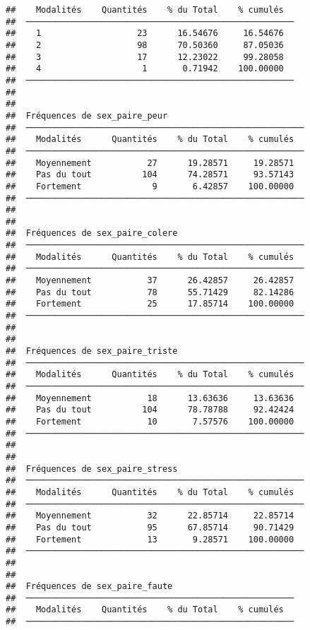 \documentclass[
]{article}
\begin{document}
\begin{verbatim}
##    Modalités    Quantités    % du Total    % cumulés   
##  ───────────────────────────────────────────────────── 
##    1                   23      16.54676     16.54676   
##    2                   98      70.50360     87.05036   
##    3                   17      12.23022     99.28058   
##    4                    1       0.71942    100.00000   
##  ───────────────────────────────────────────────────── 
## 
## 
##  Fréquences de sex_paire_peur                            
##  ─────────────────────────────────────────────────────── 
##    Modalités      Quantités    % du Total    % cumulés   
##  ─────────────────────────────────────────────────────── 
##    Moyennement           27      19.28571     19.28571   
##    Pas du tout          104      74.28571     93.57143   
##    Fortement              9       6.42857    100.00000   
##  ─────────────────────────────────────────────────────── 
## 
## 
##  Fréquences de sex_paire_colere                          
##  ─────────────────────────────────────────────────────── 
##    Modalités      Quantités    % du Total    % cumulés   
##  ─────────────────────────────────────────────────────── 
##    Moyennement           37      26.42857     26.42857   
##    Pas du tout           78      55.71429     82.14286   
##    Fortement             25      17.85714    100.00000   
##  ─────────────────────────────────────────────────────── 
## 
## 
##  Fréquences de sex_paire_triste                          
##  ─────────────────────────────────────────────────────── 
##    Modalités      Quantités    % du Total    % cumulés   
##  ─────────────────────────────────────────────────────── 
##    Moyennement           18      13.63636     13.63636   
##    Pas du tout          104      78.78788     92.42424   
##    Fortement             10       7.57576    100.00000   
##  ─────────────────────────────────────────────────────── 
## 
## 
##  Fréquences de sex_paire_stress                          
##  ─────────────────────────────────────────────────────── 
##    Modalités      Quantités    % du Total    % cumulés   
##  ─────────────────────────────────────────────────────── 
##    Moyennement           32      22.85714     22.85714   
##    Pas du tout           95      67.85714     90.71429   
##    Fortement             13       9.28571    100.00000   
##  ─────────────────────────────────────────────────────── 
## 
## 
##  Fréquences de sex_paire_faute                         
##  ───────────────────────────────────────────────────── 
##    Modalités    Quantités    % du Total    % cumulés   
##  ───────────────────────────────────────────────────── 

\end{verbatim}
\end{document}
